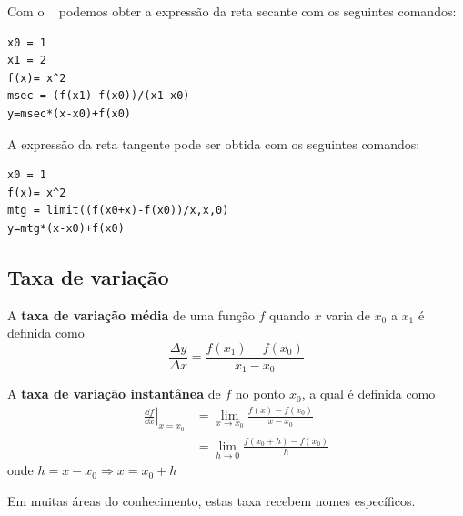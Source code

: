 \cleardoublepage\documentclass[../main.tex]{subfiles}
\begin{document}
\begin{ex}
  
  Com o \geogebra~ podemos obter a expressão da reta secante com os seguintes comandos:
\begin{verbatim}
x0 = 1
x1 = 2
f(x)= x^2
msec = (f(x1)-f(x0))/(x1-x0)
y=msec*(x-x0)+f(x0)
\end{verbatim}
A expressão da reta tangente pode ser obtida com os seguintes comandos:
\begin{verbatim}
x0 = 1
f(x)= x^2
mtg = limit((f(x0+x)-f(x0))/x,x,0)
y=mtg*(x-x0)+f(x0)
\end{verbatim}

\end{ex}

\subsection{Taxa de variação}
\begin{framed}
\begin{definition}
A {\bf taxa de variação média} de uma função $f$ quando $x$ varia de $x_0$ a $x_1$ é definida como
\begin{equation}
  \frac{\Delta y}{\Delta x} = \frac{f(x_1)-f(x_0)}{x_1-x_0}
\end{equation}
\end{definition}
\end{framed}

\begin{framed}
\begin{definition}
A {\bf taxa de variação instantânea} de $f$ no ponto $x_0$, a qual é definida como
\begin{align}
  \left.\frac{\dd f}{\dd x}\right|_{x=x_0} &= \lim_{x\to x_0} \frac{f(x)-f(x_0)}{x-x_0}\\
                             &= \lim_{h\to 0} \frac{f(x_0+h)-f(x_0)}{h}
\end{align}
onde $h=x-x_0\Rightarrow x=x_0+h$
\end{definition}\end{framed}
Em muitas áreas do conhecimento, estas taxa recebem nomes específicos.
\end{document}
